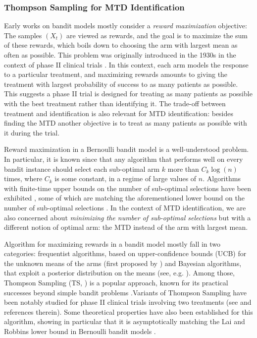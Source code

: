 \subsubsection{Thompson Sampling for MTD Identification}

Early works on bandit models \citep{Robbins52,LaiRobbins85bandits} mostly consider a \emph{reward maximization} objective: The samples $(X_t)$ are viewed as rewards, and the goal is to maximize the sum of these rewards, which boils down to choosing the arm with largest mean as often as possible. This problem was originally introduced in the 1930s in the context of phase II clinical trials \citep{10.2307/2332286}. In this context, each arm models the response to a particular treatment, and maximizing rewards amounts to giving the treatment with largest probability of success to as many patients as possible. This suggests a phase II trial is designed for treating as many patients as possible with the best treatment rather than identifying it. The trade-off between treatment and identification is also relevant for MTD identification: besides finding the MTD another objective is to treat as many patients as possible with it during the trial.

Reward maximization in a Bernoulli bandit model is a well-understood problem. In particular, it is known since \citep{LaiRobbins85bandits} that any algorithm that performs well on every bandit instance should select each sub-optimal arm $k$ more than $C_k\log(n)$ times, where $C_k$ is some constant, in a regime of large values of $n$. Algorithms with finite-time upper bounds on the number of sub-optimal selections have been exhibited \citep{Aueral02,Audibertal09UCBV}, some of which are matching the aforementioned lower bound on the number of sub-optimal selections \citep{KLUCBJournal}. In the context of MTD identification, we are also concerned about \emph{ minimizing the number of sub-optimal selections} but with a different notion of optimal arm: the MTD instead of the arm with largest mean. 

Algorithm for maximizing rewards in a bandit model mostly fall in two categories: frequentist algorithms, based on upper-confidence bounds (UCB) for the unknown means of the arms (first proposed by \cite{KatRob:95Gauss,Aueral02}) and Bayesian algorithms, that exploit a posterior distribution on the means (see, e.g. \cite{AISTATS12}). Among those, Thompson Sampling (TS, \citep{10.2307/2332286}) is a popular approach, known for its practical successes beyond simple bandit problems \citep{AGContext13,Agrawal17TSRL}.Variants of Thompson Sampling have been notably studied for phase II clinical trials involving two treatments (see \cite{Thall07} and references therein). Some theoretical properties have also been established for this algorithm, showing in particular that it is asymptotically matching the Lai and Robbins lower bound in Bernoulli bandit models \citep{ALT12,AGAISTAT13}. 


